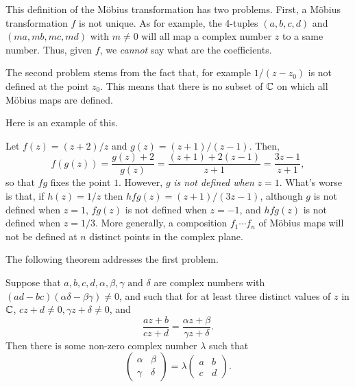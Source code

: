\documentclass[main.tex]{subfiles}
\begin{document}
		This definition of the M\"obius transformation has two problems. First, a M\"obius transformation $f$ is not unique. As for example, the 4-tuples $(a,b,c,d)$ and $(ma, mb, mc, md)$ with $m \neq 0$ will all map a complex number $z$ to a same number. Thus, given $f$, we \textit{cannot} say what are the coefficients.
		
		The second problem stems from the fact that, for example $1/(z - z_0)$ is not defined at the point $z_0$. This means that there is no subset of $\mathbb C$ on which all M\"obius maps are defined.
		
		Here is an example of this.
		\begin{example}
			Let $f(z) = (z + 2)/ z$ and $g(z) = (z + 1)/(z - 1)$. Then,
			\begin{equation*}
				f(g(z)) = \frac{g(z) + 2}{g(z)} = \frac{(z + 1)+ 2(z-1)}{z+ 1} = \frac{3z - 1}{z + 1},
			\end{equation*}
			so that $fg$ fixes the point $1$. However, $g$ \textit{is not defined when} $z = 1$. What's worse is that, if $h(z) = 1/z$ then $hfg(z) = (z+1)/(3z - 1)$, although $g$ is not defined when $z = 1$, $fg(z)$ is not defined when $z = -1$, and $hfg(z)$ is not defined when $z = 1/3$. More generally, a composition $f_1 \cdots f_n$ of M\"obius maps will not be defined at $n$ distinct points in the complex plane.
		\end{example}
		The following theorem addresses the first problem.
		\begin{theorem}
			Suppose that $a, b, c, d, \alpha, \beta, \gamma \text{ and } \delta$ are complex numbers with ${(ad - bc)}{(\alpha\delta - \beta\gamma)}{ \neq 0}$, and such that for at least three distinct values of $z$ in $\mathbb C$, $cz + d \neq 0, \gamma z+ \delta \neq 0$, and
			\begin{equation*}
				\frac{az + b}{cz + d} = \frac{\alpha z + \beta}{\gamma z + \delta}.
			\end{equation*}
			Then there is some non-zero complex number $\lambda$ such that
			\begin{equation}
				\begin{pmatrix}
					\alpha & \beta \\
					\gamma & \delta
				\end{pmatrix}
				= \lambda\begin{pmatrix}
					a & b \\
					c & d
				\end{pmatrix}.
			\end{equation}
		\end{theorem}
\end{document}
